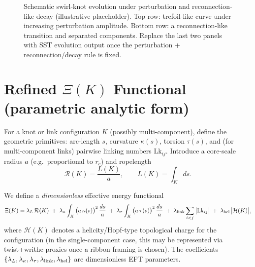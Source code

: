 \documentclass[10pt]{article}
\begin{document}
\begin{figure}[h]

    \caption{Schematic swirl-knot evolution under perturbation and reconnection-like decay (illustrative placeholder). Top row: trefoil-like curve under increasing perturbation amplitude. Bottom row: a reconnection-like transition and separated components. Replace the last two panels with SST evolution output once the perturbation + reconnection/decay rule is fixed.}
    \label{fig:knot-evolution-panel}
    \end{figure}



\section{Refined $\Xi(K)$ Functional (parametric analytic form)}
\label{sec:v076-xi}

For a knot or link configuration $K$ (possibly multi-component), define the geometric primitives:
arc-length $s$, curvature $\kappa(s)$, torsion $\tau(s)$, and (for multi-component links) pairwise
linking numbers $\mathrm{Lk}_{ij}$. Introduce a core-scale radius $a$ (e.g.\ proportional to $r_c$)
and ropelength
\begin{equation}
\mathcal{R}(K)=\frac{L(K)}{a},
\qquad
L(K)=\int_K ds.
\end{equation}

We define a \emph{dimensionless} effective energy functional
\begin{equation}
\Xi(K)=\lambda_L\,\mathcal{R}(K)
\;+\;\lambda_\kappa \int_K \big(a\,\kappa(s)\big)^2 \,\frac{ds}{a}
\;+\;\lambda_\tau \int_K \big(a\,\tau(s)\big)^2 \,\frac{ds}{a}
\;+\;\lambda_{\rm link}\sum_{i<j}\big|\mathrm{Lk}_{ij}\big|
\;+\;\lambda_{\rm hel}\,\big|\mathcal{H}(K)\big|,
\label{eq:XiK}
\end{equation}
where $\mathcal{H}(K)$ denotes a helicity/Hopf-type topological charge for the configuration (in the
single-component case, this may be represented via twist+writhe proxies once a ribbon framing is chosen).
The coefficients $\{\lambda_L,\lambda_\kappa,\lambda_\tau,\lambda_{\rm link},\lambda_{\rm hel}\}$ are
dimensionless EFT parameters.
\end{document}
